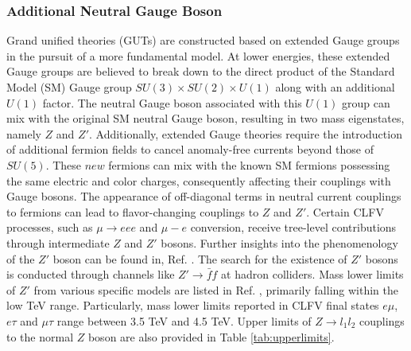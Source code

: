 \subsubsection{Additional Neutral Gauge Boson}
Grand unified theories (GUTs) are constructed based on extended Gauge groups in the pursuit of a more fundamental model. At lower energies, these extended Gauge groups are believed to break down to the direct product of the Standard Model (SM) Gauge group $SU(3) \times SU(2) \times U(1)$ along with an additional $U(1)$ factor. The neutral Gauge boson associated with this $U(1)$ group can mix with the original SM neutral Gauge boson, resulting in two mass eigenstates, namely $Z$ and $Z'$. Additionally, extended Gauge theories require the introduction of additional fermion fields to cancel anomaly-free currents beyond those of $SU(5)$. These $new$ fermions can mix with the known SM fermions possessing the same electric and color charges, consequently affecting their couplings with Gauge bosons. The appearance of off-diagonal terms in neutral current couplings to fermions can lead to flavor-changing couplings to $Z$ and $Z'$. Certain CLFV processes, such as $\mu \rightarrow eee$ and $\mu-e$ conversion, receive tree-level contributions through intermediate $Z$ and $Z'$ bosons. Further insights into the phenomenology of the $Z'$ boson can be found in, Ref. \cite{Leike_1999}. The search for the existence of $Z'$ bosons is conducted through channels like $Z' \rightarrow \bar{f}f$ at hadron colliders. Mass lower limits of $Z'$ from various specific models are listed in Ref. \cite{zyla}, primarily falling within the low TeV range. Particularly, mass lower limits reported in CLFV final states $e\mu$, $e\tau$ and $\mu\tau$ range between 3.5 TeV and 4.5 TeV. Upper limits of $Z \rightarrow l_1 l_2$ couplings to the normal $Z$ boson are also provided in Table \ref{tab:upperlimits}.

% 
